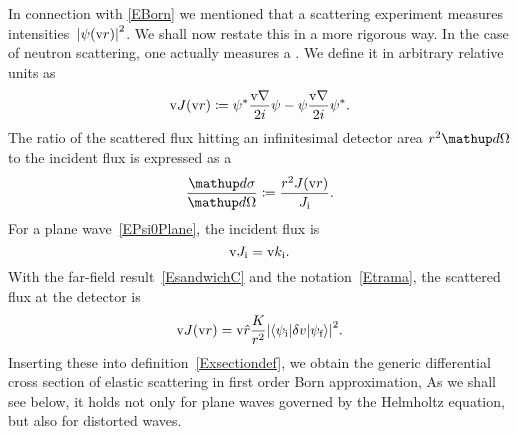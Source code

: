 In connection with \cref{EBorn} we mentioned
that a scattering experiment measures intensities~${|\psi(\text{v}{r})|}^2$.
We shall now restate this in a more rigorous way.
In the case of neutron scattering,
one actually measures a .
We define it in arbitrary relative units as
\begin{equation}\label{EdefJ}
  \text{v}{J}(\text{v}{r}) \coloneqq  \psi^*\frac{\text{v}{\nabla}}{2i}\psi - \psi\frac{\text{v}{\nabla}}{2i}\psi^*.
\end{equation}
%
%
The ratio of the scattered flux hitting an infinitesimal detector area
$r^2\d\Omega$ to the incident flux is expressed as a
%
%
%
%
\begin{equation}\label{Exsectiondef}
  \xElas
  \coloneqq  \frac{r^2 J(\r)}{J_\si}.
\end{equation}
%
%
For a plane wave~\cref{EPsi0Plane}, the incident flux is
%
%
\begin{equation}\label{EJi}
  \text{v}{J}_{\text{i}} = \text{v}{k}_{\text{i}}.
\end{equation}
With the far-field result~\cref{EsandwichC}
and the notation~\cref{Etrama},
the scattered flux at the detector is
\begin{equation}\label{EJr}
  \text{v}{J}(\text{v}{r})
  = \text{v}{\hat r}\frac{K}{r^2}
    {\left|\left\langle\psi_{\text{i}}|\delta v|\psi_{\text{f}}\right\rangle\right|}^2.
\end{equation}
Inserting these into definition~\cref{Exsectiondef},
we obtain the generic differential cross section
of elastic scattering in first order Born approximation,
%
%
%
%
As we shall see below,
it holds not only for plane waves governed
by the Helmholtz equation,
but also for distorted waves.
%

